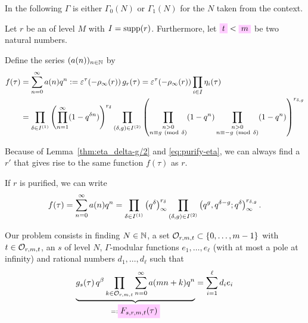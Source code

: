 \documentclass{article}
\begin{document}
In the following $\Gamma$ is either $\Gamma_0(N)$ or $\Gamma_1(N)$ for
the $N$ taken from the context.

Let $r$ be an  of level $M$ with
$I=\operatorname{supp}(r)$.
%
Furthermore, let $\defineNotation{t} < \defineNotation{m}$ be two
natural numbers.

Define the series $(a(n))_{n\in\mathbb{N}}$ by
\begin{align}
  f(\tau)
  &=
    \sum_{n=0}^\infty a(n)q^n
    :=
    \varepsilon^\tau\!\left(-\rho_\infty(r)\right) g_r(\tau)
    =
    \varepsilon^\tau\!\left(-\rho_\infty(r)\right) \prod_{i\in I} \eta_i(\tau)
  \notag
  \\
  &= \prod_{\delta\in I^{(1)}}
    \left(\prod_{n=1}^{\infty}(1-q^{\delta n})\right)^{r_\delta}
    \prod_{(\delta,g)\in I^{(2)}}
    \left(
    \prod_{\substack{n>0\\n\equiv g\ (\mathrm{mod}\ \delta)}} (1-q^n)
    \prod_{\substack{n>0\\n\equiv -g\ (\mathrm{mod}\ \delta)}} (1-q^n)
    \right)^{r_{\delta,g}}
  \label{eq:f(tau)}
\end{align}

Because of Lemma~\ref{thm:eta_delta-g/2} and \eqref{eq:purify-eta}, we
can always find a  $r'$ that gives
rise to the same function $f(\tau)$ as $r$.

If $r$ is purified, we can write
\begin{gather}
  f(\tau)
  =
    \sum_{n=0}^\infty a(n)q^n
  =
  \prod_{\delta\in I^{(1)}} \left({q}^{\delta}\right)_{\infty}^{r_\delta}
  \prod_{(\delta,g)\in I^{(2)}}
    \left( q^g, q^{\delta-g};q^\delta \right)_{\infty}^{r_{\delta,g}}.
\end{gather}


Our problem consists in finding $N\in\mathbb{N}$, a set
$\mathcal{O}_{r,m,t} \subset \left\{0,\ldots,m-1\right\}$ with
$t\in\mathcal{O}_{r,m,t}$, an 
$s$ of level $N$, $\Gamma$-modular functions
$e_1,\ldots,e_\ell$ (with at most a pole at infinity) and rational
numbers $d_1,\ldots,d_\ell$ such that
\begin{gather}
  \underbrace{
    g_s(\tau)\,
    q^\beta
    \prod_{k\in\modularOrbit{r,m,t}} \sum_{n=0}^\infty a(mn+k) q^n
    }_{=:\defineNotation[F-s,r,m,t-tau]{F_{s,r,m,t}(\tau)}}
  =
  \sum_{i=1}^\ell d_i e_i
  \label{eq:Ramanujan-Kolberg-Identity}
\end{gather}
\end{document}

